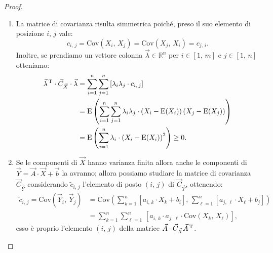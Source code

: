         \begin{proof}
            \hfill
            \begin{enumerate}
                \item La matrice di covarianza risulta simmetrica poiché, preso il suo elemento di posizione $i,\,j$ vale: \[
                c_{i,\,j} = \text{Cov}(X_{i},\,X_{j}) = \text{Cov}(X_{j},\,X_{i}) = c_{j,\,i}
            .\] Inoltre, se prendiamo un vettore colonna $\vec{\lambda} \in \mathbb{R}^n$ per $i\in [1,\,m]$ e $j\in [1,\,n]$ otteniamo:
                \begin{align*}
                    \vec{\lambda}^{\text{\,T}} \cdot \vec{C}_{\vec{X}} \cdot \vec{\lambda} &=
                    \sum_{i=1}^{n} \sum_{j=1}^{n}\, [\lambda_i \lambda_j \cdot c_{i,\,j}] \\
                    &= \text{E}\left(\sum_{i=1}^{n} \sum_{j=1}^{n} \lambda_i \lambda_j \cdot 
                    \left(X_i-\text{E}(X_i)\right)\left(X_j-\text{E}(X_j)\right)\right) \\
                    &= \text{E}\left(\sum_{i=1}^{n} \lambda_i \cdot \left(X_i-\text{E}(X_i)\right)^2\right) \geq 0
                .\end{align*}
            \item Se le componenti di $\vec{X}$ hanno varianza finita allora anche le componenti di $\vec{Y} = \vec{A} \cdot \vec{X} + \vec{b}$ la avranno; allora possiamo studiare la matrice di covarianza $\vec{C}_{\vec{Y}}$ considerando $\tilde{c}_{i,\,j}$ l'elemento di posto $(i,\,j)$ di $\vec{C}_{\vec{Y}}$, ottenendo:
                \begin{align*}
                    \tilde{c}_{i,\,j} = \text{Cov}\left(\vec{Y}_i,\, \vec{Y}_j\right)
                    &= \text{Cov}\left(\sum_{k=1}^{n} [a_{i,\,k} \cdot X_k + b_i],\, 
                    \sum_{\ell=1}^{n} [a_{j,\,\ell} \cdot X_\ell + b_j]\right) \\
                    &= \sum_{k=1}^{n} \sum_{\ell=1}^{n}\, \left[a_{i,\,k} \cdot a_{j,\,\ell} \cdot \text{Cov}(X_k,\, X_{\ell})\right]
                ,\end{align*}
                esso è proprio l'elemento $(i,\,j)$ della matrice $\vec{A} \cdot \vec{C}_{\vec{X}}\vec{A}^{\text{\,T}}$. \qedhere
            \end{enumerate}
        \end{proof}
